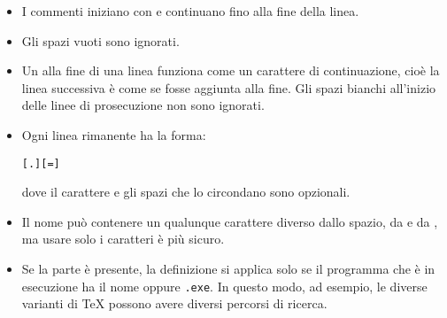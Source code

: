 \documentclass{article}
\begin{document}
\begin{itemize}
\item
  I commenti iniziano con \code{\%} e continuano fino alla fine della
  linea.
\item
  Gli spazi vuoti sono ignorati.
\item
  Un \bs{} alla fine di una linea funziona come un carattere di
  continuazione, cioè la linea successiva è come se fosse aggiunta alla
  fine. Gli spazi bianchi all'inizio delle linee di prosecuzione non sono
  ignorati.
\item
  Ogni linea rimanente ha la forma:
\begin{alltt}
  [.] [=] 
\end{alltt}
  dove il carattere \samp{=} e gli spazi che lo circondano sono opzionali.
\item
  Il nome  può contenere un qualunque carattere diverso
  dallo spazio, da \samp{=} e da , ma usare solo i caratteri
   è più sicuro.
\item
  Se la parte  è presente, la definizione si
  applica solo se il programma che è in esecuzione ha il nome
  \texttt{} oppure \texttt{.exe}. In
  questo modo, ad esempio, le diverse varianti di \TeX{} possono avere
  diversi percorsi di ricerca.

\end{itemize}
\end{document}
